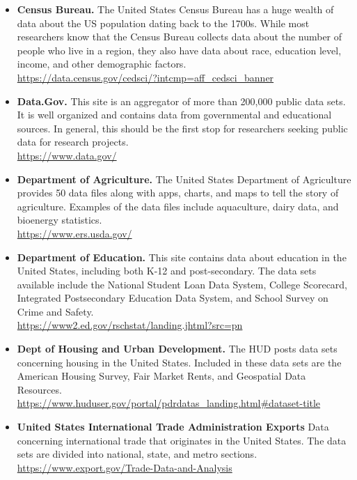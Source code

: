 \begin{itemize}
	\item \textbf{Census Bureau.} The United States Census Bureau has a huge wealth of data about the US population dating back to the 1700s. While most researchers know that the Census Bureau collects data about the number of people who live in a region, they also have data about race, education level, income, and other demographic factors. 
	\\ \url{https://data.census.gov/cedsci/?intcmp=aff_cedsci_banner}

	\item \textbf{Data.Gov.} This site is an aggregator of more than 200,000 public data sets. It is well organized and contains data from governmental and educational sources. In general, this should be the first stop for researchers seeking public data for research projects.
	\\ \url{https://www.data.gov/}

	\item \textbf{Department of Agriculture.} The United States Department of Agriculture provides 50 data files along with apps, charts, and maps to tell the story of agriculture. Examples of the data files include aquaculture, dairy data, and bioenergy statistics. 
	\\ \url{https://www.ers.usda.gov/}

	\item \textbf{Department of Education.} This site contains data about education in the United States, including both K-12 and post-secondary. The data sets available include the National Student Loan Data System, College Scorecard, Integrated Postsecondary Education Data System, and School Survey on Crime and Safety. 
	\\ \url{https://www2.ed.gov/rschstat/landing.jhtml?src=pn}

	\item \textbf{Dept of Housing and Urban Development.} The HUD posts data sets concerning housing in the United States. Included in these data sets are the American Housing Survey, Fair Market Rents, and Geospatial Data Resources. 
	\\ \url{https://www.huduser.gov/portal/pdrdatas_landing.html#dataset-title}

	\item \textbf{United States International Trade Administration Exports} Data concerning international trade that originates in the United States. The data sets are divided into national, state, and metro sections.   
	\\ \url{https://www.export.gov/Trade-Data-and-Analysis}


\end{itemize}
